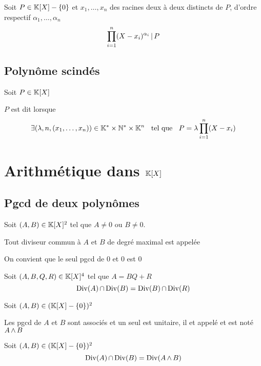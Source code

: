 \begin{prp}
  Soit $P \in \mathbb{K}[X] - \{0\}$ et $x_1, \ldots, x_n$ des racines
  deux à deux distincts de $P$, d'ordre respectif $\alpha_1, \ldots, \alpha_n$
  \[
    \prod^n_{i = 1} (X - x_i)^{\alpha_i} \operatorname{|} P
  \]
\end{prp}

\subsection{Polynôme scindés}

\begin{dfn}
  Soit $P \in \mathbb{K}[X]$

  $P$ est dit  lorsque
  \[
    \exists (\lambda, n, (x_1, \ldots, x_n)) \in \mathbb{K}^* \times \mathbb{N}^* \times \mathbb{K}^n
    \;\;\text{ tel que }\;\; P = \lambda \prod^n_{i = 1} (X - x_i)
  \]
\end{dfn}


\section{Arithmétique dans $\mathbb{K}[X]$}

\subsection{Pgcd de deux polynômes}

\begin{dfn}
  Soit $(A, B) \in \mathbb{K}[X]^2$ tel que $A \neq 0$ ou $B \neq 0$.
  
  Tout diviseur commun à $A$ et $B$ de degré maximal est appelée

  On convient que le seul pgcd de $0$ et $0$ est $0$
\end{dfn}

\begin{prp}
  Soit $(A, B, Q, R) \in \mathbb{K}[X]^4$ tel que $A = BQ + R$
  \[
    \operatorname{\mathrm{Div}}(A) \operatorname{\cap} \operatorname{\mathrm{Div}}(B) = \operatorname{\mathrm{Div}}(B) \operatorname{\cap} \operatorname{\mathrm{Div}}(R)
  \]
\end{prp}

\begin{thm}
  Soit $(A, B) \in (\mathbb{K}[X] - \{0\})^2$

  Les pgcd de $A$ et $B$ sont associés et un seul est
  unitaire, il et appelé 
  et est noté $A \operatorname{\wedge} B$
\end{thm}

\begin{thm}
  Soit $(A, B) \in (\mathbb{K}[X] - \{0\})^2$
  \[
    \operatorname{\mathrm{Div}}(A) \operatorname{\cap} \operatorname{\mathrm{Div}}(B) = \operatorname{\mathrm{Div}}(A \operatorname{\wedge} B)
  \]
\end{thm}

